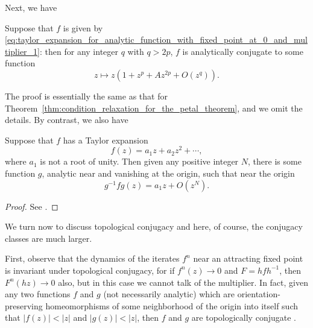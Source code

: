 Next, we have

\begin{theorem}
    Suppose that $f$ is given by
    \eqref{eq:taylor_expansion_for_analytic_function_with_fixed_point_at_0_and_multiplier_1}:
    then for any integer $q$ with $q > 2p$, $f$ is analytically conjugate to
    some function
    \begin{equation*}
        z \mapsto z(1 + z^p + A z^{2p} + O(z^q)).
    \end{equation*}
\end{theorem}

The proof is essentially the same as that for
Theorem~\ref{thm:condition_relaxation_for_the_petal_theorem}, and we omit the
details. By contrast, we also have

\begin{theorem}
    Suppose that $f$ has a Taylor expansion
    \begin{equation*}
        f(z) = a_1 z + a_2 z^2 + \cdots,
    \end{equation*}
    where $a_1$ is not a root of unity. Then given any positive integer $N$,
    there is some function $g$, analytic near and vanishing at the origin, such
    that near the origin
    \begin{equation*}
        g^{-1} f g(z) = a_1 z + O(z^N).
    \end{equation*}
\end{theorem}
\begin{proof}
    See \cite[154]{Beardon1991}.
\end{proof}

We turn now to discuss topological conjugacy and here, of course, the conjugacy
classes are much larger.

\begin{remark}
    First, observe that the dynamics of the iterates $f^n$ near an attracting
    fixed point is invariant under topological conjugacy, for if $f^n(z) \to 0$
    and $F = h f h^{-1}$, then $F^n(hz) \to 0$ also, but in this case we cannot
    talk of the multiplier. In fact, given any two functions $f$ and $g$ (not
    necessarily analytic) which are orientation-preserving homeomorphisms of
    some neighborhood of the origin into itself such that $|f(z)| < |z|$ and
    $|g(z)| < |z|$, then $f$ and $g$ are topologically conjugate
    \cite{Sternberg1957}.
\end{remark}

